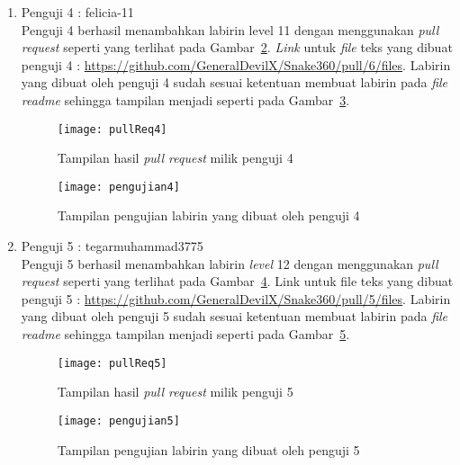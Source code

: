\begin{enumerate}
	\begin{figure}[H]
		\centering  
		\texttt{[image: pengujian3]}  
		\caption[Tampilan pengujian labirin yang dibuat oleh penguji 3]{Tampilan pengujian labirin yang dibuat oleh penguji 3}
		\label{fig:pengujian3} 
	\end{figure}
	
	\item Penguji 4 : felicia-11\\
	Penguji 4 berhasil menambahkan labirin level 11 dengan menggunakan \textit{pull request} seperti yang terlihat pada Gambar~\ref{fig:pullReq4}. \textit{Link} untuk \textit{file} teks yang dibuat penguji 4 : \url{https://github.com/GeneralDevilX/Snake360/pull/6/files}. Labirin yang dibuat oleh penguji 4 sudah sesuai ketentuan membuat labirin pada \textit{file readme} sehingga tampilan menjadi seperti pada Gambar~\ref{fig:pengujian4}.
	
	\begin{figure}[H]
		\centering  
		\texttt{[image: pullReq4]}  
		\caption[Tampilan hasil \textit{pull request} milik penguji 4]{Tampilan hasil \textit{pull request} milik penguji 4}
		\label{fig:pullReq4} 
	\end{figure}
	
	\begin{figure}[H]
		\centering  
		\texttt{[image: pengujian4]}  
		\caption[Tampilan pengujian labirin yang dibuat oleh penguji 4]{Tampilan pengujian labirin yang dibuat oleh penguji 4}
		\label{fig:pengujian4} 
	\end{figure}
	
	\item Penguji 5 : tegarmuhammad3775\\
	Penguji 5 berhasil menambahkan labirin \textit{level} 12 dengan menggunakan \textit{pull request} seperti yang terlihat pada Gambar~\ref{fig:pullReq5}. Link untuk file teks yang dibuat penguji 5 : \url{https://github.com/GeneralDevilX/Snake360/pull/5/files}. Labirin yang dibuat oleh penguji 5 sudah sesuai ketentuan membuat labirin pada \textit{file readme} sehingga tampilan menjadi seperti pada Gambar~\ref{fig:pengujian5}.
	
	\begin{figure}[H]
		\centering  
		\texttt{[image: pullReq5]}  
		\caption[Tampilan hasil \textit{pull request} milik penguji 5]{Tampilan hasil \textit{pull request} milik penguji 5}
		\label{fig:pullReq5} 
	\end{figure}
	
	\begin{figure}[H]
		\centering  
		\texttt{[image: pengujian5]}  
		\caption[Tampilan pengujian labirin yang dibuat oleh penguji 5]{Tampilan pengujian labirin yang dibuat oleh penguji 5}
		\label{fig:pengujian5} 
	\end{figure}
\end{enumerate}